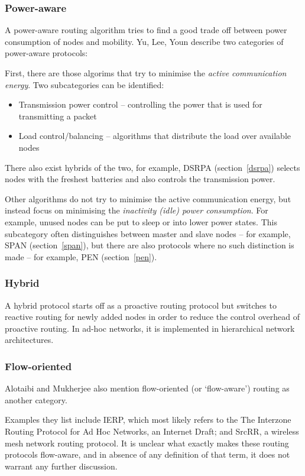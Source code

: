 \subsubsection*{Power-aware}
A power-aware routing algorithm tries to find a good trade off between
power consumption of nodes and mobility. Yu, Lee, Youn\cite{main1} describe two categories
of power-aware protocols:

First, there are those algorims that try to minimise the \textit{active communication energy}. Two
subcategories can be identified:
\begin{itemize}
    \item Transmission power control -- controlling the power that is used for transmitting a packet
    \item Load control/balancing -- algorithms that distribute the load over available nodes
\end{itemize}
There also exist hybrids of the two, for example, DSRPA (section~\ref{dsrpa})
selects nodes with the freshest batteries and also controls the transmission
power.

Other algorithms do not try to minimise the active communication energy, but
instead focus on minimising the  \textit{inactivity (idle) power consumption}. For example, unused
nodes can be put to sleep or into lower power states. This subcategory often
distinguishes between master and slave nodes -- for example, SPAN (section~\ref{span}), but there are also protocols
where no such distinction is made -- for example, PEN (section~\ref{pen}).

\subsubsection*{Hybrid}
A hybrid protocol starts off as a proactive routing protocol but switches
to reactive routing for newly added nodes in order to reduce the control
overhead of proactive routing. In ad-hoc networks, it is implemented in
hierarchical network architectures.

\subsubsection*{Flow-oriented}
Alotaibi and Mukherjee\cite{alotaibi2012survey} also mention flow-oriented (or `flow-aware')
routing as another category.

Examples they list include
IERP, which most likely refers to the The Interzone Routing Protocol for Ad Hoc Networks, an Internet Draft\cite{manet-zone-ierp-02};
and SrcRR\cite{aguayo2005srcrr}, a wireless mesh network routing protocol. It is unclear what exactly
makes these routing protocols flow-aware, and in absence of any definition of
that term, it does not warrant any further discussion. 

